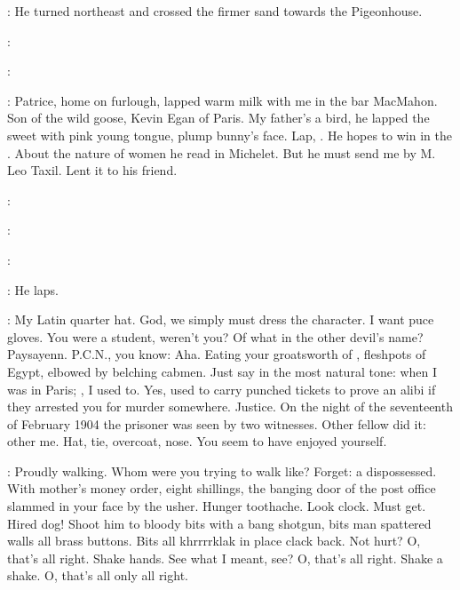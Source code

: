 :
He turned northeast and crossed the firmer sand
towards the Pigeonhouse.

\patrice:

\Stephen:

\StephenInt:
Patrice, home on furlough, lapped warm milk with me in the bar MacMahon.
Son of the wild goose, Kevin Egan of Paris.
My father's a bird,
he lapped the sweet  with pink young tongue,
plump bunny's face.
Lap, .
He hopes to win in the .
About the nature of women he read in Michelet.
But he must send me  by M. Leo Taxil.
Lent it to his friend.

\patrice:

\Stephen:

\patrice:

\StephenInt:
He laps.

\StephenInt:
My Latin quarter hat.
God, we simply must dress the character.
I want puce gloves.
You were a student, weren't you?
Of what in the other devil's name?
Paysayenn.
P.C.N., you know:
Aha.
Eating your groatsworth of ,
fleshpots of Egypt, elbowed by belching cabmen.
Just say in the most natural tone:
when I was in Paris;
, I used to.
Yes, used to carry punched tickets to prove an alibi
if they arrested you for murder somewhere.
Justice.
On the night of the seventeenth of February 1904
the prisoner was seen by two witnesses.
Other fellow did it:
other me.
Hat, tie, overcoat, nose.
You seem to have enjoyed yourself.

\StephenInt:
Proudly walking.
Whom were you trying to walk like?
Forget:
a dispossessed.
With mother's money order, eight shillings,
the banging door of the post office slammed in your face by the usher.
Hunger toothache.
Look clock.
Must get.
Hired dog!
Shoot him to bloody bits with a bang shotgun,
bits man spattered walls all brass buttons.
Bits all khrrrrklak in place clack back.
Not hurt?
O, that's all right.
Shake hands.
See what I meant, see?
O, that's all right.
Shake a shake.
O, that's all only all right.

